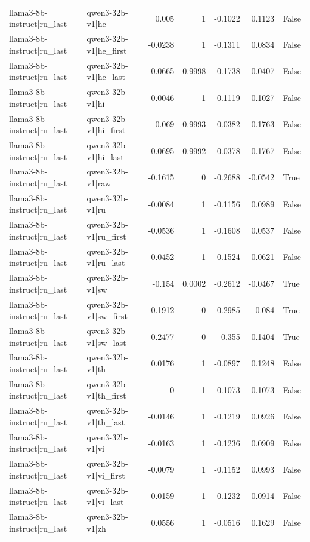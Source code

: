\begin{table}
\begin{tabular}{l l r r r r l}
llama3-8b-instruct|ru_last & qwen3-32b-v1|he & 0.005 & 1 & -0.1022 & 0.1123 & False \\
llama3-8b-instruct|ru_last & qwen3-32b-v1|he_first & -0.0238 & 1 & -0.1311 & 0.0834 & False \\
llama3-8b-instruct|ru_last & qwen3-32b-v1|he_last & -0.0665 & 0.9998 & -0.1738 & 0.0407 & False \\
llama3-8b-instruct|ru_last & qwen3-32b-v1|hi & -0.0046 & 1 & -0.1119 & 0.1027 & False \\
llama3-8b-instruct|ru_last & qwen3-32b-v1|hi_first & 0.069 & 0.9993 & -0.0382 & 0.1763 & False \\
llama3-8b-instruct|ru_last & qwen3-32b-v1|hi_last & 0.0695 & 0.9992 & -0.0378 & 0.1767 & False \\
llama3-8b-instruct|ru_last & qwen3-32b-v1|raw & -0.1615 & 0 & -0.2688 & -0.0542 & True \\
llama3-8b-instruct|ru_last & qwen3-32b-v1|ru & -0.0084 & 1 & -0.1156 & 0.0989 & False \\
llama3-8b-instruct|ru_last & qwen3-32b-v1|ru_first & -0.0536 & 1 & -0.1608 & 0.0537 & False \\
llama3-8b-instruct|ru_last & qwen3-32b-v1|ru_last & -0.0452 & 1 & -0.1524 & 0.0621 & False \\
llama3-8b-instruct|ru_last & qwen3-32b-v1|sw & -0.154 & 0.0002 & -0.2612 & -0.0467 & True \\
llama3-8b-instruct|ru_last & qwen3-32b-v1|sw_first & -0.1912 & 0 & -0.2985 & -0.084 & True \\
llama3-8b-instruct|ru_last & qwen3-32b-v1|sw_last & -0.2477 & 0 & -0.355 & -0.1404 & True \\
llama3-8b-instruct|ru_last & qwen3-32b-v1|th & 0.0176 & 1 & -0.0897 & 0.1248 & False \\
llama3-8b-instruct|ru_last & qwen3-32b-v1|th_first & 0 & 1 & -0.1073 & 0.1073 & False \\
llama3-8b-instruct|ru_last & qwen3-32b-v1|th_last & -0.0146 & 1 & -0.1219 & 0.0926 & False \\
llama3-8b-instruct|ru_last & qwen3-32b-v1|vi & -0.0163 & 1 & -0.1236 & 0.0909 & False \\
llama3-8b-instruct|ru_last & qwen3-32b-v1|vi_first & -0.0079 & 1 & -0.1152 & 0.0993 & False \\
llama3-8b-instruct|ru_last & qwen3-32b-v1|vi_last & -0.0159 & 1 & -0.1232 & 0.0914 & False \\
llama3-8b-instruct|ru_last & qwen3-32b-v1|zh & 0.0556 & 1 & -0.0516 & 0.1629 & False \\

\end{tabular}
\end{table}
